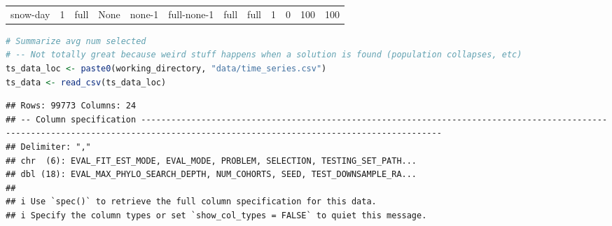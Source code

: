 \documentclass[
]{book}
\begin{document}
\begin{table}
\begin{tabular}{l|l|l|l|l|l|l|l|l|r|r|r}
\hline
\cellcolor{gray!6}{snow-day} & \cellcolor{gray!6}{0.1} & \cellcolor{gray!6}{phylo-informed-sample} & \cellcolor{gray!6}{Ancestor} & \cellcolor{gray!6}{ancestor-8} & \cellcolor{gray!6}{phylo-informed-sample-ancestor-8} & \cellcolor{gray!6}{phylo-informed-sample} & \cellcolor{gray!6}{phylo-informed-sample} & \cellcolor{gray!6}{8} & \cellcolor{gray!6}{4} & \cellcolor{gray!6}{50} & \cellcolor{gray!6}{46}\\
\hline
snow-day & 1 & full & None & none-1 & full-none-1 & full & full & 1 & 0 & 100 & 100\\
\hline
\end{tabular}
\endgroup{}
\end{table}

\begin{lstlisting}[language=R]
# Summarize avg num selected
# -- Not totally great because weird stuff happens when a solution is found (population collapses, etc)
ts_data_loc <- paste0(working_directory, "data/time_series.csv")
ts_data <- read_csv(ts_data_loc)
\end{lstlisting}

\begin{lstlisting}
## Rows: 99773 Columns: 24
## -- Column specification ------------------------------------------------------------------------------------------------------------------------------------------------------------------------------------
## Delimiter: ","
## chr  (6): EVAL_FIT_EST_MODE, EVAL_MODE, PROBLEM, SELECTION, TESTING_SET_PATH...
## dbl (18): EVAL_MAX_PHYLO_SEARCH_DEPTH, NUM_COHORTS, SEED, TEST_DOWNSAMPLE_RA...
## 
## i Use `spec()` to retrieve the full column specification for this data.
## i Specify the column types or set `show_col_types = FALSE` to quiet this message.
\end{lstlisting}
\end{document}
